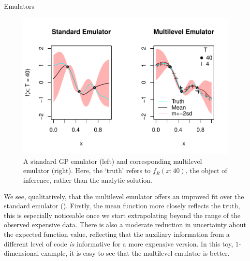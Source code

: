 \begin{chapter}{Emulators \label{Ch:Emulators}}
\begin{figure}[h]
  \centering
  \includegraphics{fig-emulators/compare-ml.pdf}
  \caption{A standard GP emulator (left) and corresponding multilevel emulator (right). Here, the `truth' refers to $f_R(x;40)$, the object of inference, rather than the analytic solution.}
  \label{Fig:compare-ml}
\end{figure}
We see, qualitatively, that the multilevel emulator offers an improved fit over the standard emulator (). Firstly, the mean function more closely reflects the truth, this is especially noticeable once we start extrapolating beyond the range of the observed expensive data. There is also a moderate reduction in uncertainty about the expected function value, reflecting that the auxiliary information from a different level of code \textit{is} informative for a more expensive version. In this toy, $1$-dimensional example, it is easy to see that the multilevel emulator is better.



\end{chapter}
